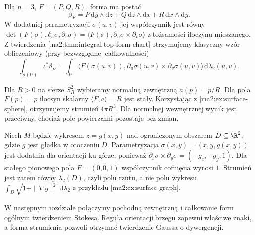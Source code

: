 Dla $n=3$, $F=(P,Q,R)$, forma ma postać
\[
 \beta_F=P\,\mathrm dy\wedge\mathrm dz+
 Q\,\mathrm dz\wedge\mathrm dx+
 R\,\mathrm dx\wedge\mathrm dy.
\]
W dodatniej parametryzacji $\sigma(u,v)$
jej współczynnik jest równy
$\det(F(\sigma),\partial_u\sigma,\partial_v\sigma)
=\langle F(\sigma),\partial_u\sigma\times\partial_v\sigma\rangle$
z tożsamości iloczynu mieszanego.
Z twierdzenia \ref{ma2:thm:integral-top-form-chart}
otrzymujemy klasyczny wzór obliczeniowy (przy
bezwzględnej całkowalności)
\[
 \int_{\sigma(U)}\iota^*\beta_F
 =\int_U\langle F(\sigma(u,v)),
 \partial_u\sigma(u,v)\times\partial_v\sigma(u,v)\rangle\,
 \mathrm d\lambda_2(u,v).
\]

\begin{przyklad}
\label{ma2:ex:flux-sphere}
Dla $R>0$ na sferze $S_R^2$ wybieramy normalną zewnętrzną
$a(p)=p/R$. Dla pola $F(p)=p$ iloczyn skalarny
$\langle F,a\rangle=R$ jest stały.
Korzystając z \ref{ma2:ex:surface-sphere},
otrzymujemy strumień $4\pi R^3$.
Dla normalnej wewnętrznej wynik jest przeciwny,
chociaż pole powierzchni pozostaje bez zmian.
\end{przyklad}

\begin{przyklad}
\label{ma2:ex:flux-graph}
Niech $M$ będzie wykresem $z=g(x,y)$ nad
ograniczonym obszarem $D\subseteq\R^2$, gdzie
$g$ jest gładka w otoczeniu $\overline D$.
Parametryzacja $\sigma(x,y)=(x,y,g(x,y))$
jest dodatnia dla orientacji ku górze, ponieważ
$\partial_x\sigma\times\partial_y\sigma=(-g_x,-g_y,1)$.
Dla stałego pionowego pola $F=(0,0,1)$
współczynnik cofnięcia wynosi $1$.
Strumień jest zatem równy $\lambda_2(D)$,
czyli polu rzutu, a nie polu wykresu
$\int_D\sqrt{1+\|\nabla g\|^2}\,\mathrm d\lambda_2$
z przykładu \ref{ma2:ex:surface-graph}.
\end{przyklad}

W następnym rozdziale połączymy pochodną
zewnętrzną i całkowanie form ogólnym twierdzeniem
Stokesa. Reguła orientacji brzegu zapewni
właściwe znaki, a forma strumienia pozwoli
otrzymać twierdzenie Gaussa o dywergencji.
